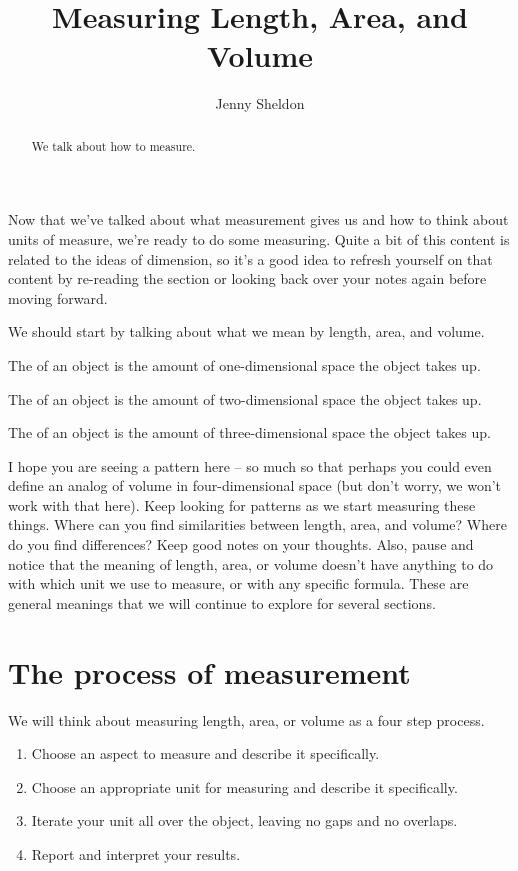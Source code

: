 \documentclass{ximera}
\title{Measuring Length, Area, and Volume}
\author{Jenny Sheldon}
\begin{document}
\begin{abstract}
We talk about how to measure.
\end{abstract}
\maketitle

Now that we've talked about what measurement gives us and how to think about units of measure, we're ready to do some measuring. Quite a bit of this content is related to the ideas of dimension, so it's a good idea to refresh yourself on that content by re-reading the section or looking back over your notes again before moving forward.

We should start by talking about what we mean by length, area, and volume.
\begin{definition}
The  of an object is the amount of one-dimensional space the object takes up.
\end{definition}
\begin{definition}
The  of an object is the amount of two-dimensional space the object takes up.
\end{definition}
\begin{definition}
The  of an object is the amount of three-dimensional space the object takes up.
\end{definition}
I hope you are seeing a pattern here -- so much so that perhaps you could even define an analog of volume in four-dimensional space (but don't worry, we won't work with that here). Keep looking for patterns as we start measuring these things. Where can you find similarities between length, area, and volume? Where do you find differences? Keep good notes on your thoughts. Also, pause and notice that the meaning of length, area, or volume doesn't have anything to do with which unit we use to measure, or with any specific formula. These are general meanings that we will continue to explore for several sections.

\section{The process of measurement}
We will think about measuring length, area, or volume as a four step process.
\begin{enumerate}[label=\arabic{enumi}.]
	\item Choose an aspect to measure and describe it specifically.
	\item Choose an appropriate unit for measuring and describe it specifically.
	\item Iterate your unit all over the object, leaving no gaps and no overlaps.
	\item Report and interpret your results.
\end{enumerate}
\end{document}
